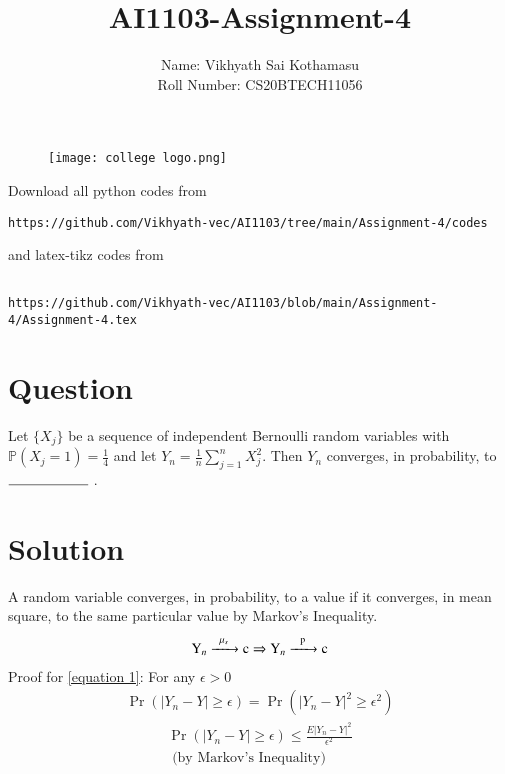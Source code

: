 \documentclass[journal,12pt,twocolumn]{IEEEtran}
\begin{document}
\title{AI1103-Assignment-4}
\author{Name: Vikhyath Sai Kothamasu\\Roll Number: CS20BTECH11056}
\maketitle
\newpage
\bigskip
\renewcommand{\thefigure}{\theenumi}
\renewcommand{\thetable}{\theenumi}

\begin{figure} [h]
    \texttt{[image: college logo.png]}
\end{figure}

Download all python codes from 
\begin{lstlisting}
https://github.com/Vikhyath-vec/AI1103/tree/main/Assignment-4/codes
\end{lstlisting}
%
and latex-tikz codes from 
%
\begin{lstlisting}

https://github.com/Vikhyath-vec/AI1103/blob/main/Assignment-4/Assignment-4.tex
\end{lstlisting}
\section*{Question}
Let $\{X_j\}$ be a sequence of independent Bernoulli random variables with $\mathbb{P}(X_j=1) = \frac{1}{4}$ and let $Y_n = \frac{1}{n} \sum_{j=1}^{n}X_j^2$. Then $Y_n$ converges, in probability, to $\rule{2cm}{0.15mm}$ .

\section*{Solution}
A random variable converges, in probability, to a value if it converges, in mean square, to the same particular value by Markov's Inequality.
\begin{align}
    \ce{Y_n ->[\mu_s] c} \Rightarrow \ce{Y_n ->[p] c} \label{equation 1}
\end{align}
Proof for \eqref{equation 1}: For any $\epsilon > 0$
\begin{align}
    \Pr{(|Y_n-Y|\geq \epsilon)} = \Pr{(|Y_n-Y|^2\geq \epsilon^2)}
\end{align}
\begin{multline}
    \Pr{(|Y_n-Y|\geq \epsilon)}  \leq \frac{E|Y_n-Y|^2}{\epsilon^2} 
    \\\text{ (by Markov's Inequality)}
\end{multline}
 
\end{document}

